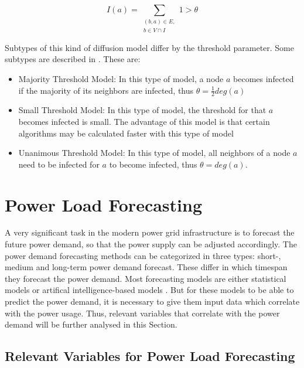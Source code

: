 \begin{equation}
    I(a) = \sum\limits_{\substack{(b,a)\in E, \\ b \in V \cap I}}
    1 > \theta    
    \label{eq:threshold}
\end{equation}

Subtypes of this kind of diffusion model differ by the threshold parameter.
Some subtypes are described in \cite{diffusionbasics}. These are:

\begin{itemize}
    \item Majority Threshold Model: In this type of model, a node $a$ becomes
    infected if the majority of its neighbors are infected, thus 
    $\theta = \frac{1}{2}deg(a)$
    \item Small Threshold Model: In this type of model, the threshold for that
    $a$ becomes infected is small. The advantage of this model is that 
    certain algorithms may be calculated faster with this type of model 
    \cite{diffusionbasics} 
    \item Unanimous Threshold Model: In this type of model, all neighbors 
    of a node $a$ need to be infected for $a$ to become infected, thus
    $\theta = deg(a)$.
\end{itemize}


\section{Power Load Forecasting}
\label{powerloadsection}
A very significant task in the modern power grid infrastructure is to forecast
the future power demand, so that the power supply can be adjusted accordingly.
The power demand forecasting methods can be categorized in three types:
short-, medium and long-term power demand forecast. These differ in which
timespan they forecast the power demand. Most forecasting models are 
either statistical models or artifical intelligence-based models 
\cite{raza2015review}. But for these models to be able to predict the power 
demand, it is necessary to give them input data which correlate with the power 
usage. Thus, relevant variables that correlate with the power demand will
be further analysed in this Section.

\subsection{Relevant Variables for Power Load Forecasting}

